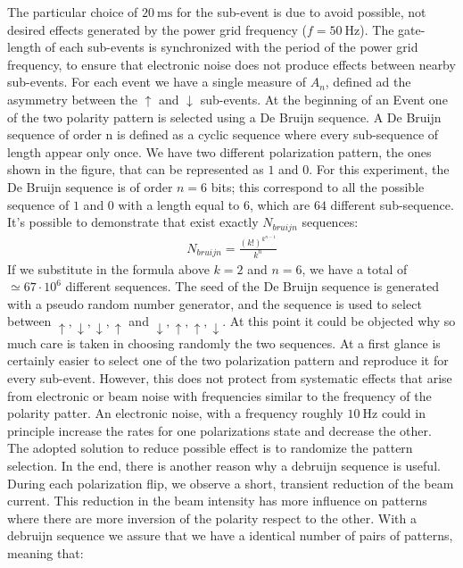 The particular choice of $\SI{20}{\milli \second}$ for the sub-event is due to avoid possible, not desired effects generated by the power grid frequency ($f = \SI{50}{\hertz}$). The gate-length of each sub-events is synchronized with the period of the power grid frequency, to ensure that electronic noise does not produce effects between nearby sub-events.
For each event we have a single measure of $A_{n}$, defined ad the asymmetry between the $\uparrow$ and $\downarrow$ sub-events.
At the beginning of an Event one of the two polarity pattern is selected using a De Bruijn sequence. A De Bruijn sequence of order n is defined as a cyclic sequence where every sub-sequence of length appear only once. We have two different polarization pattern, the ones shown in the figure, that can be represented as $1$ and $0$. For this experiment, the De Bruijn sequence is of order $n = 6$ bits; this correspond to all the possible sequence of $1$ and $0$ with a length equal to $6$, which are $64$ different sub-sequence.
It's possible to demonstrate that exist exactly $N_{bruijn}$ sequences: 
\begin{align*}
N_{bruijn} = \frac{(k!)^{k^{n-1}}}{k^{n}}
\end{align*}
If we substitute in the formula above $k=2$ and $n = 6$, we have a total of $\simeq 67 \cdot 10^{6}$ different sequences. The seed of the De Bruijn sequence is generated with a pseudo random number generator, and the sequence is used to select between $\uparrow,\downarrow,\downarrow, \uparrow$  and $\downarrow,\uparrow,\uparrow,\downarrow$. At this point it could be objected why so much care is taken in choosing randomly the two sequences. At a first glance is certainly easier to select one of the two polarization pattern and reproduce it for every sub-event. However, this does not protect from systematic effects that arise from electronic or beam noise with frequencies similar to the frequency of the polarity patter.  
An electronic noise, with a frequency roughly $\SI{10}{\hertz}$ could in principle increase the rates for one polarizations state and decrease the other. The adopted solution to reduce possible effect is to randomize the pattern selection. In the end, there is another reason why a debruijn sequence is useful. During each polarization flip, we observe a short, transient reduction of the beam current. This reduction in the beam intensity has more influence on patterns where there are more inversion of the polarity respect to the other. With a debruijn sequence we assure that we have a identical number of pairs of patterns, meaning that:

